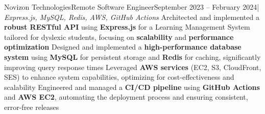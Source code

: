 \resumeSubheading
  {Novizon Technologies}{Remote}
  {Software Engineer}{September 2023 -- February 2024}{| \textit{Express.js, MySQL, Redis, AWS, GitHub Actions}}
  \resumeItemListStart
    {Architected and implemented a \textbf{robust RESTful API} using \textbf{Express.js} for a Learning Management System tailored for dyslexic students, focusing on \textbf{scalability} and \textbf{performance optimization}}
    {Designed and implemented a \textbf{high-performance database system} using \textbf{MySQL} for persistent storage and \textbf{Redis} for caching, significantly improving query response times}
    {Leveraged \textbf{AWS services} (EC2, S3, CloudFront, SES) to enhance system capabilities, optimizing for cost-effectiveness and scalability}
    {Engineered and managed a \textbf{CI/CD pipeline} using \textbf{GitHub Actions} and \textbf{AWS EC2}, automating the deployment process and ensuring consistent, error-free releases}
  \resumeItemListEnd